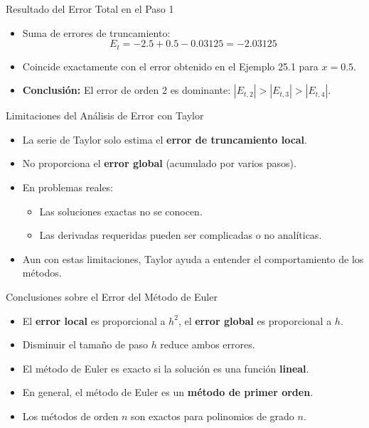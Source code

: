 \documentclass[main.tex]{subfiles}
\begin{document}
\begin{frame}{\small Resultado del Error Total en el Paso 1}
\begin{itemize}
  \item Suma de errores de truncamiento:
  \[
    E_t = -2.5 + 0.5 - 0.03125 = -2.03125
  \]
  \item Coincide exactamente con el error obtenido en el Ejemplo 25.1 para $x=0.5$.
  \item \textbf{Conclusi\'on:} El error de orden 2 es dominante: $|E_{t,2}| > |E_{t,3}| > |E_{t,4}|$.
\end{itemize}
\end{frame}

\begin{frame}{\small Limitaciones del An\'alisis de Error con Taylor}
\begin{itemize}
  \item La serie de Taylor solo estima el \textbf{error de truncamiento local}.
  \item No proporciona el \textbf{error global} (acumulado por varios pasos).
  \item En problemas reales:
  \begin{itemize}
    \item Las soluciones exactas no se conocen.
    \item Las derivadas requeridas pueden ser complicadas o no anal\'iticas.
  \end{itemize}
  \item Aun con estas limitaciones, Taylor ayuda a entender el comportamiento de los m\'etodos.
\end{itemize}
\end{frame}

\begin{frame}{\small Conclusiones sobre el Error del M\'etodo de Euler}
\begin{itemize}
  \item El \textbf{error local} es proporcional a $h^2$, el \textbf{error global} es proporcional a $h$.
  \item Disminuir el tama\~no de paso $h$ reduce ambos errores.
  \item El m\'etodo de Euler es exacto si la soluci\'on es una funci\'on \textbf{lineal}.
  \item En general, el m\'etodo de Euler es un \textbf{m\'etodo de primer orden}.
  \item Los m\'etodos de orden $n$ son exactos para polinomios de grado $n$.
\end{itemize}
\end{frame}
\end{document}
